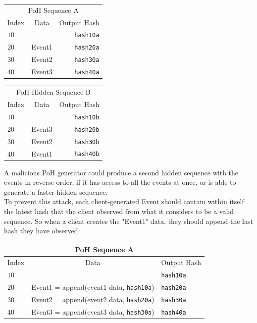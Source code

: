 \documentclass[12pt]{article}
\begin{document}
\begin{center}
  \begin{tabular}{ | l c r |}
    \hline
    \multicolumn{3}{|c|}{PoH Sequence A} \\
    Index & Data & Output Hash  \\ \hline
    $10$ & & \texttt{hash10a} \\ 
    $20$ & Event1 & \texttt{hash20a} \\ 
    $30$ & Event2 & \texttt{hash30a} \\ 
    $40$ & Event3 & \texttt{hash40a} \\
    \hline
    \end{tabular}
  \begin{tabular}{ | l c r |}
    \hline
    \multicolumn{3}{|c|}{PoH Hidden Sequence B} \\
    Index & Data & Output Hash \\ \hline
    $10$ & & \texttt{hash10b}\\ 
    $20$ & Event3 & \texttt{hash20b}  \\ 
    $30$ & Event2 & \texttt{hash30b} \\ 
    $40$ & Event1 & \texttt{hash40b} \\
    \hline
    \end{tabular}
\end{center}

A malicious PoH generator could produce a second hidden sequence with the events in reverse order, if it has access to all the events at once, or is able to generate a faster hidden sequence.\\

To prevent this attack, each client-generated Event should contain within itself the latest hash that the client observed from what it considers to be a valid sequence. So when a client creates the "Event1" data, they should append the last hash they have observed.\\

\begin{center}
  \begin{tabular}{  l  c l}

    \multicolumn{3}{c}{PoH Sequence A} \\
    \hline
    Index  & Data & Output Hash  \\ \hline
    $10$ & & \texttt{hash10a} \\ 
    $20$ & Event1 = append(event1 data, \texttt{hash10a}) & \texttt{hash20a}  \\ 
    $30$ & Event2 = append(event2 data, \texttt{hash20a}) & \texttt{hash30a} \\ 
    $40$ &  Event3 = append(event3 data, \texttt{hash30a}) & \texttt{hash40a} \\
    \end{tabular}
\end{center}
\end{document}
